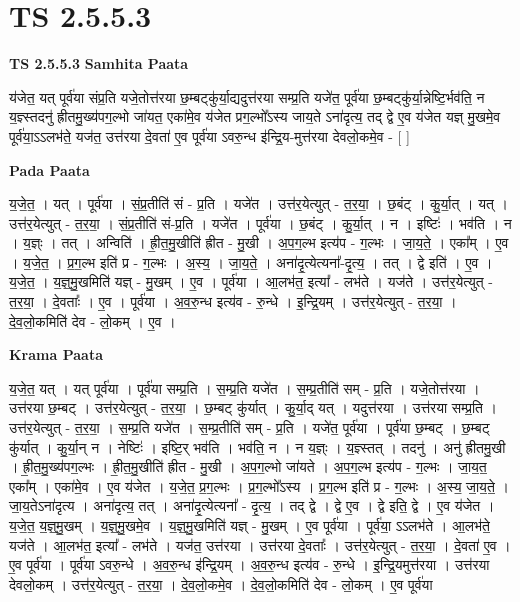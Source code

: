 \documentclass[17pt]{extarticle}
\begin{document}
\section*{ TS 2.5.5.3 }

\textbf{TS 2.5.5.3 } \newline
\textbf{Samhita Paata} \newline

य॑जेत॒ यत् पूर्व॑या संप्र॒ति यजे॒तोत्त॑रया छ॒म्बट्कु॑र्या॒द्यदुत्त॑रया सम्प्र॒ति यजे॑त॒ पूर्व॑या छ॒म्बट्कु॑र्या॒न्नेष्टि॒र्भव॑ति॒ न य॒ज्ञ्स्तदनु॑ ह्रीतमु॒ख्य॑पग॒ल्भो जा॑यत॒ एका॑मे॒व य॑जेत प्रग॒ल्भो᳚ऽस्य जाय॒ते ऽना॑दृत्य॒ तद् द्वे ए॒व य॑जेत यज्ञ् मु॒खमे॒व पूर्व॑या॒ऽऽलभ॑ते॒ यज॑त॒ उत्त॑रया दे॒वता॑ ए॒व पूर्व॑या ऽवरु॒न्ध इ॑न्द्रि॒य-मुत्त॑रया देवलो॒कमे॒व - [  ] \newline

\textbf{Pada Paata} \newline

य॒जे॒त॒ । यत् । पूर्व॑या । सं॒प्र॒तीति॑ सं - प्र॒ति । यजे॑त । उत्त॑र॒येत्युत् - त॒र॒या॒ । छ॒बंट् । कु॒र्या॒त् । यत् । उत्त॑र॒येत्युत् - त॒र॒या॒ । सं॒प्र॒तीति॑ सं-प्र॒ति । यजे॑त । पूर्व॑या । छ॒बंट् । कु॒र्या॒त् । न । इष्टिः॑ । भव॑ति । न । य॒ज्ञ्ः । तत् । अन्विति॑ । ह्री॒त॒मु॒खीति॑ ह्रीत - मु॒खी । अ॒प॒ग॒ल्भ इत्य॑प - ग॒ल्भः । जा॒य॒ते॒ । एका᳚म् । ए॒व । य॒जे॒त॒ । प्र॒ग॒ल्भ इति॑ प्र - ग॒ल्भः । अ॒स्य॒ । जा॒य॒ते॒ । अना॑दृ॒त्येत्यना᳚-दृ॒त्य॒ । तत् । द्वे इति॑ । ए॒व । य॒जे॒त॒ । य॒ज्ञ्॒मु॒खमिति॑ यज्ञ् - मु॒खम् । ए॒व । पूर्व॑या । आ॒लभ॑त॒ इत्या᳚ - लभ॑ते । यज॑ते । उत्त॑र॒येत्युत् - त॒र॒या॒ । दे॒वताः᳚ । ए॒व । पूर्व॑या । अ॒व॒रु॒न्ध इत्य॑व - रु॒न्धे । इ॒न्द्रि॒यम् । उत्त॑र॒येत्युत् - त॒र॒या॒ । दे॒व॒लो॒कमिति॑ देव - लो॒कम् । ए॒व ।  \newline


\textbf{Krama Paata} \newline

य॒जे॒त॒ यत् । यत् पूर्व॑या । पूर्व॑या सम्प्र॒ति । स॒म्प्र॒ति यजे॑त । स॒म्प्र॒तीति॑ सम् - प्र॒ति । यजे॒तोत्त॑रया । उत्त॑रया छ॒म्बट् । उत्त॑र॒येत्युत् - त॒र॒या॒ । छ॒म्बट् कु॑र्यात् । कु॒र्या॒द् यत् । यदुत्त॑रया । उत्त॑रया सम्प्र॒ति । उत्त॑र॒येत्युत् - त॒र॒या॒ । स॒म्प्र॒ति यजे॑त । स॒म्प्र॒तीति॑ सम् - प्र॒ति । यजे॑त॒ पूर्व॑या । पूर्व॑या छ॒म्बट् । छ॒म्बट् कु॑र्यात् । कु॒र्या॒न् न । नेष्टिः॑ । इष्टि॒र् भव॑ति । भव॑ति॒ न । न य॒ज्ञ्ः । य॒ज्ञ्स्तत् । तदनु॑ । अनु॑ ह्रीतमु॒खी । ह्री॒त॒मु॒ख्य॑पग॒ल्भः । ह्री॒त॒मु॒खीति॑ ह्रीत - मु॒खी । अ॒प॒ग॒ल्भो जा॑यते । अ॒प॒ग॒ल्भ इत्य॑प - ग॒ल्भः । जा॒य॒त॒ एका᳚म् । एका॑मे॒व । ए॒व य॑जेत । य॒जे॒त॒ प्र॒ग॒ल्भः । प्र॒ग॒ल्भो᳚ऽस्य । प्र॒ग॒ल्भ इति॑ प्र - ग॒ल्भः । अ॒स्य॒ जा॒य॒ते॒ । जा॒य॒तेऽना॑दृत्य । अना॑दृत्य॒ तत् । अना॑दृ॒त्येत्यना᳚ - दृ॒त्य॒ । तद् द्वे । द्वे ए॒व । द्वे इति॒ द्वे । ए॒व य॑जेत । य॒जे॒त॒ य॒ज्ञ्॒मु॒खम् । य॒ज्ञ्॒मु॒खमे॒व । य॒ज्ञ्॒मु॒खमिति॑ यज्ञ् - मु॒खम् । ए॒व पूर्व॑या । पूर्व॑या॒ ऽऽलभ॑ते । आ॒लभ॑ते॒ यज॑ते । आ॒लभ॑त॒ इत्या᳚ - लभ॑ते । यज॑त॒ उत्त॑रया । उत्त॑रया दे॒वताः᳚ । उत्त॑र॒येत्युत् - त॒र॒या॒ । दे॒वता॑ ए॒व । ए॒व पूर्व॑या । पूर्व॑या ऽवरु॒न्धे । अ॒व॒रु॒न्ध इ॑न्द्रि॒यम् । अ॒व॒रु॒न्ध इत्य॑व - रु॒न्धे । इ॒न्द्रि॒यमुत्त॑रया । उत्त॑रया देवलो॒कम् । उत्त॑र॒येत्युत् - त॒र॒या॒ । दे॒व॒लो॒कमे॒व । दे॒व॒लो॒कमिति॑ देव - लो॒कम् । ए॒व पूर्व॑या \newline
\end{document}
